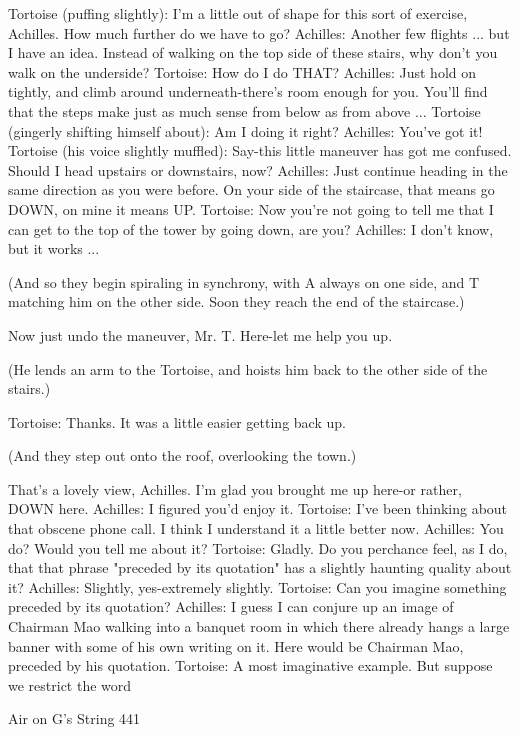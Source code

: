 Tortoise (puffing slightly): I'm a little out of shape for this sort of exercise,
Achilles. How much further do we have to go?
Achilles: Another few flights ... but I have an idea. Instead of walking on the top side of
  these stairs, why don't you walk on the underside?
Tortoise: How do I do THAT?
Achilles: Just hold on tightly, and climb around underneath-there's room enough for you.
  You'll find that the steps make just as much sense from below as from above ...
Tortoise (gingerly shifting himself about): Am I doing it right?
Achilles: You've got it!
Tortoise (his voice slightly muffled): Say-this little maneuver has got me confused.
  Should I head upstairs or downstairs, now?
Achilles: Just continue heading in the same direction as you were before. On your side of
  the staircase, that means go DOWN, on mine it means UP.
Tortoise: Now you're not going to tell me that I can get to the top of the tower by going
  down, are you?
Achilles: I don't know, but it works ...

   (And so they begin spiraling in synchrony, with A always on one side, and T
     matching him on the other side. Soon they reach the end of the staircase.)

   Now just undo the maneuver, Mr. T. Here-let me help you up.

   (He lends an arm to the Tortoise, and hoists him back to the other side of the
     stairs.)

Tortoise: Thanks. It was a little easier getting back up.

   (And they step out onto the roof, overlooking the town.)

  That's a lovely view, Achilles. I'm glad you brought me up here-or rather, DOWN
      here.
Achilles: I figured you'd enjoy it.
Tortoise: I've been thinking about that obscene phone call. I think I understand it a little
  better now.
Achilles: You do? Would you tell me about it?
Tortoise: Gladly. Do you perchance feel, as I do, that that phrase "preceded by its
  quotation" has a slightly haunting quality about it?
Achilles: Slightly, yes-extremely slightly.
Tortoise: Can you imagine something preceded by its quotation?
Achilles: I guess I can conjure up an image of Chairman Mao walking into a banquet
  room in which there already hangs a large banner with some of his own writing on it.
  Here would be Chairman Mao, preceded by his quotation.
Tortoise: A most imaginative example. But suppose we restrict the word



Air on G's String                                                                       441

